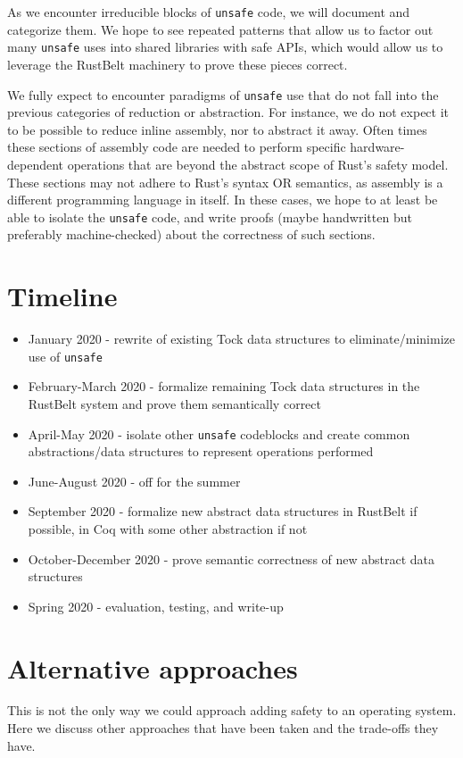 \documentclass[12pt]{article}
\begin{document}
As we encounter irreducible blocks of \texttt{unsafe} code, we will document and categorize them. We hope to see repeated patterns that allow us to factor out many \texttt{unsafe} uses into shared libraries with safe APIs, which would allow us to leverage the RustBelt machinery to prove these pieces correct.

We fully expect to encounter paradigms of \texttt{unsafe} use that do not fall into the previous categories of reduction or abstraction. For instance, we do not expect it to be possible to reduce inline assembly, nor to abstract it away. Often times these sections of assembly code are needed to perform specific hardware-dependent operations that are beyond the abstract scope of Rust's safety model. These sections may not adhere to Rust's syntax OR semantics, as assembly is a different programming language in itself. In these cases, we hope to at least be able to isolate the \texttt{unsafe} code, and write proofs (maybe handwritten but preferably machine-checked) about the correctness of such sections.



\section{Timeline}
\begin{itemize}
    \item January 2020 - rewrite of existing Tock data structures to eliminate/minimize use of \texttt{unsafe}
    \item February-March 2020 - formalize remaining Tock data structures in the RustBelt system and prove them semantically correct
    \item April-May 2020 - isolate other \texttt{unsafe} codeblocks and create common abstractions/data structures to represent operations performed
    \item June-August 2020 - off for the summer
    \item September 2020 - formalize new abstract data structures in RustBelt if possible, in Coq with some other abstraction if not
    \item October-December 2020 - prove semantic correctness of new abstract data structures
    \item Spring 2020 - evaluation, testing, and write-up
\end{itemize}

\section{Alternative approaches}
This is not the only way we could approach adding safety to an operating system. Here we discuss other approaches that have been taken and the trade-offs they have.
\end{document}
